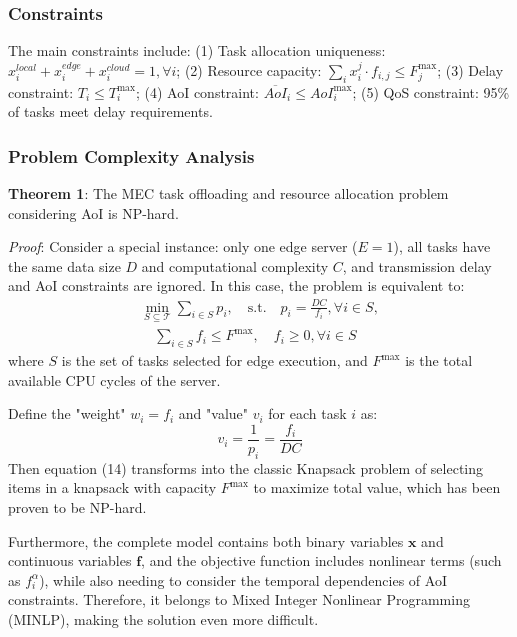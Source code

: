 \documentclass[conference]{IEEEtran}
\begin{document}
\subsubsection{Constraints}
The main constraints include:
(1) Task allocation uniqueness: $x_{i}^{local} + x_{i}^{edge} + x_{i}^{cloud} = 1, \forall i$;
(2) Resource capacity: $\sum_{i} x_{i}^{j} \cdot f_{i,j} \leq F_{j}^{\max}$;
(3) Delay constraint: $T_i \leq T_i^{\max}$;
(4) AoI constraint: $\overline{AoI}_i \leq AoI_i^{\max}$;
(5) QoS constraint: 95\% of tasks meet delay requirements.

\subsubsection{Problem Complexity Analysis}
\textbf{Theorem 1}: The MEC task offloading and resource allocation problem considering AoI is NP-hard.

\textit{Proof}: Consider a special instance: only one edge server ($E = 1$), all tasks have the same data size $D$ and computational complexity $C$, and transmission delay and AoI constraints are ignored. In this case, the problem is equivalent to:
\begin{equation}
    \begin{split}
        \min_{S \subseteq \mathcal{T}} \sum_{i \in S} p_i, \quad
        \text{s.t.} \quad p_i = \frac{DC}{f_i}, \forall i \in S, \\
        \quad
        \sum_{i \in S} f_i \leq F^{\max}, \quad
        f_i \geq 0, \forall i \in S
    \end{split}
\end{equation}
where $S$ is the set of tasks selected for edge execution, and $F^{\max}$ is the total available CPU cycles of the server.

Define the "weight" $w_i = f_i$ and "value" $v_i$ for each task $i$ as:
\begin{equation}
v_i = \frac{1}{p_i} = \frac{f_i}{DC}
\end{equation}
Then equation (14) transforms into the classic Knapsack problem of selecting items in a knapsack with capacity $F^{\max}$ to maximize total value, which has been proven to be NP-hard.

Furthermore, the complete model contains both binary variables $\mathbf{x}$ and continuous variables $\mathbf{f}$, and the objective function includes nonlinear terms (such as $f_i^{\alpha}$), while also needing to consider the temporal dependencies of AoI constraints. Therefore, it belongs to Mixed Integer Nonlinear Programming (MINLP), making the solution even more difficult. 
\end{document}
